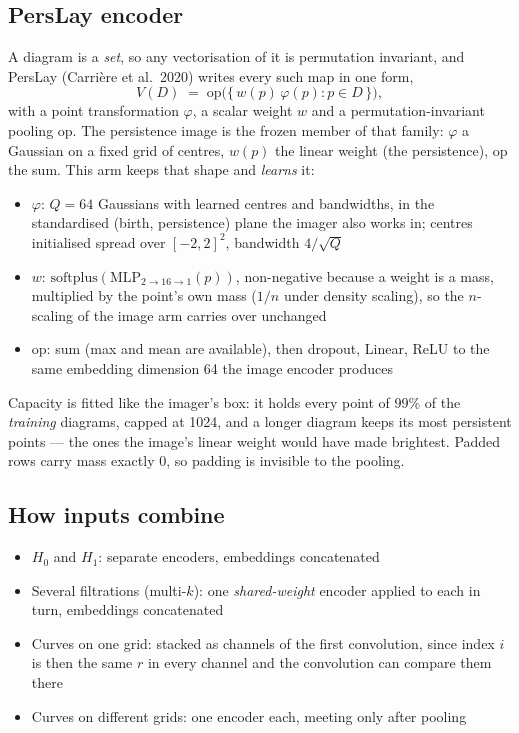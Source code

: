 \documentclass[11pt]{article}
\begin{document}
\subsection*{PersLay encoder}
A diagram is a \emph{set}, so any vectorisation of it is permutation invariant, and PersLay
(Carri\`ere et al.\ 2020) writes every such map in one form,
\[
  V(D) \;=\; \mathrm{op}\bigl(\{\, w(p)\,\varphi(p) : p \in D \,\}\bigr),
\]
with a point transformation $\varphi$, a scalar weight $w$ and a permutation-invariant pooling
$\mathrm{op}$. The persistence image is the frozen member of that family: $\varphi$ a Gaussian on a
fixed grid of centres, $w(p)$ the linear weight (the persistence), $\mathrm{op}$ the sum. This arm
keeps that shape and \emph{learns} it:
\begin{itemize}
  \item $\varphi$: $Q=64$ Gaussians with learned centres and bandwidths, in the standardised
        (birth, persistence) plane the imager also works in; centres initialised spread over
        $[-2,2]^2$, bandwidth $4/\sqrt{Q}$
  \item $w$: $\mathrm{softplus}(\mathrm{MLP}_{2\to16\to1}(p))$, non-negative because a weight is a
        mass, multiplied by the point's own mass ($1/n$ under density scaling), so the $n$-scaling
        of the image arm carries over unchanged
  \item $\mathrm{op}$: sum (max and mean are available), then dropout, Linear, ReLU to the same
        embedding dimension 64 the image encoder produces
\end{itemize}
Capacity is fitted like the imager's box: it holds every point of 99\% of the \emph{training}
diagrams, capped at 1024, and a longer diagram keeps its most persistent points --- the ones the
image's linear weight would have made brightest. Padded rows carry mass exactly $0$, so padding is
invisible to the pooling.

\subsection*{How inputs combine}
\begin{itemize}
  \item $H_0$ and $H_1$: separate encoders, embeddings concatenated
  \item Several filtrations (multi-$k$): one \emph{shared-weight} encoder applied to each in turn, embeddings concatenated
  \item Curves on one grid: stacked as channels of the first convolution, since index $i$ is then the same $r$ in every channel and the convolution can compare them there
  \item Curves on different grids: one encoder each, meeting only after pooling
\end{itemize}
\end{document}
